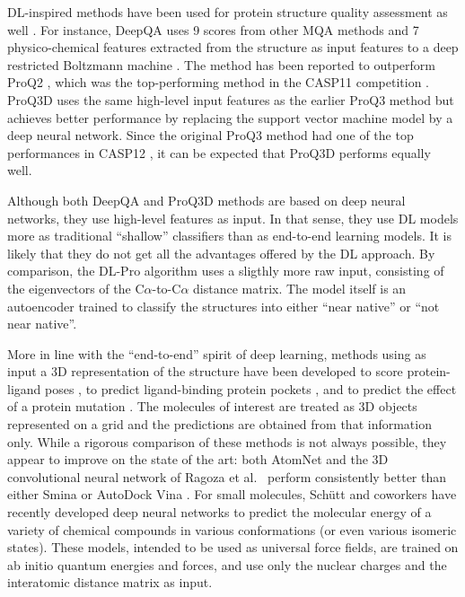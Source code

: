 \documentclass{bioinfo}
\begin{document}
DL-inspired methods have been used for protein structure quality
assessment as well \citep{nguyen2014dlpro, cao2016deepqa,
uziela2017proq3d}. For instance, DeepQA \citep{cao2016deepqa} uses 9
scores from other MQA methods and 7 physico-chemical features
extracted from the structure as input features to a deep restricted
Boltzmann machine \citep{hinton2006fast}. The method has been
reported to outperform ProQ2 \citep{ray2012proq2},
which was the top-performing method in the CASP11
competition \citep{kryshtafovych2015}.  ProQ3D \citep{uziela2017proq3d}
uses the same high-level input features as the earlier ProQ3
method \citep{uziela2016proq3} but achieves better
performance by replacing the support vector machine model by a deep
neural network. Since the original ProQ3 method had one of the top
performances in CASP12 \citep{elofsson2017qacasp12}, it can be expected
that ProQ3D performs equally well.

Although both DeepQA and ProQ3D
methods are based on deep neural networks, they use high-level
features as input. In that sense, they use DL models more as
traditional ``shallow'' classifiers than as end-to-end learning
models. It is likely that they do not get all the advantages offered
by the DL approach.
By comparison, the DL-Pro algorithm \citep{nguyen2014dlpro} uses a
sligthly more raw input, consisting of the eigenvectors of the
C$\alpha$-to-C$\alpha$ distance matrix. The model itself is an
autoencoder \citep{hinton2006reducing} trained to classify the
structures into either ``near native'' or ``not near native''.

More in line with the ``end-to-end'' spirit of deep learning, methods
using as input a 3D representation of the structure have been
developed to score protein-ligand poses \citep{wallach2015atomnet,
ragoza2017protein}, to predict ligand-binding protein
pockets \citep{jimenez2017deepsite}, and to predict the effect of a
protein mutation \citep{torng2017}. The molecules of interest are
treated as 3D objects represented on a grid and the predictions are
obtained from that information only. While a rigorous comparison of
these methods is not always possible, they appear to
improve on the state of the art: both
AtomNet \citep{wallach2015atomnet} and the 3D convolutional neural
network of Ragoza et al.\ \citep{ragoza2017protein} perform
consistently better than either Smina \citep{koes2013smina} or AutoDock
Vina \citep{trott2009vina}.
For small molecules, Sch\"{u}tt and coworkers \cite{schutt2017quantum,
schutt2017moleculenet} have recently developed deep neural networks to predict
the molecular energy of a variety of chemical compounds in various
conformations (or even various isomeric states). These models,
intended to be used as universal force fields, are trained on ab
initio quantum energies and forces, and use only the nuclear charges and the
interatomic distance matrix as input.
\end{document}
